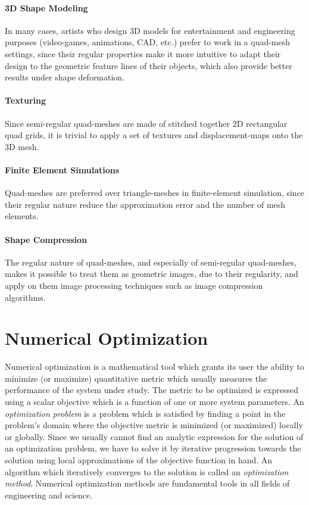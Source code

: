 \paragraph{3D Shape Modeling} In many cases, artists who design 3D models for entertainment and engineering purposes (video-games, animations, CAD, etc.) prefer to work in a quad-mesh settings, since their regular properties make it more intuitive to adapt their design to the geometric feature lines of their objects, which also provide better results under shape deformation.

\paragraph{Texturing} Since semi-regular quad-meshes are made of stitched together 2D rectangular quad grids, it is trivial to apply a set of textures and displacement-maps onto the 3D mesh.

\paragraph{Finite Element Simulations} Quad-meshes are preferred over triangle-meshes in finite-element simulation, since their regular nature reduce the approximation error and the number of mesh elements.

\paragraph{Shape Compression} The regular nature of quad-meshes, and especially of semi-regular quad-meshes, makes it possible to treat them as geometric images, due to their regularity, and apply on them image processing techniques such as image compression algorithms.

\section{Numerical Optimization}
Numerical optimization is a mathematical tool which grants its user the ability to minimize (or maximize) quantitative metric which usually measures the performance of the system under study. The metric to be optimized is expressed using a scalar objective which is a function of one or more system parameters. An \emph{optimization problem} is a problem which is satisfied by finding a point in the problem's domain where the objective metric is minimized (or maximized) locally or globally. Since we usually cannot find an analytic expression for the solution of an optimization problem, we have to solve it by iterative progression towards the solution using local approximations of the objective function in hand. An algorithm which iteratively converges to the solution is called an \emph{optimization method}. Numerical optimization methods are fundamental tools in all fields of engineering and science.

